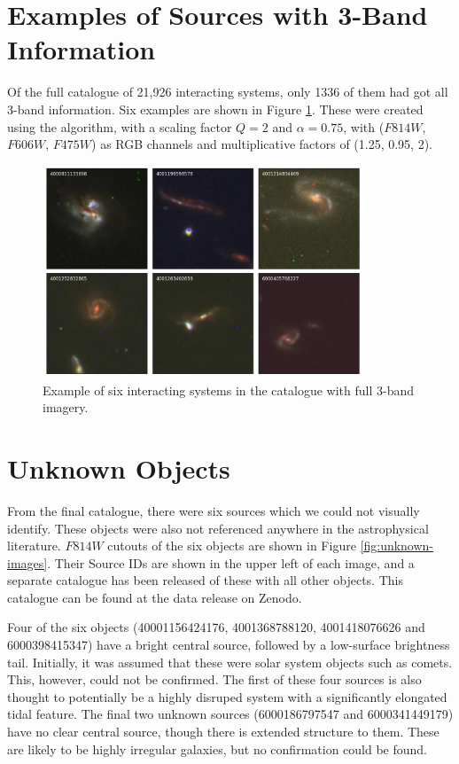 \section{Examples of Sources with 3-Band Information}\label{colour-images}
\noindent Of the full catalogue of 21,926 interacting systems, only 1336 of them had got all 3-band information. Six examples are shown in Figure \ref{fig:colour-images}. These were created using the \citet{lupton_04} algorithm, with a scaling factor $Q = 2$ and $\alpha = 0.75$, with ($F814W$, $F606W$, $F475W$) as RGB channels and multiplicative factors of (1.25, 0.95, 2).

\begin{figure}
  \centering
  \includegraphics[width = 0.85\textwidth]{Chapter2/figures/fig16.jpeg}
  \caption{Example of six interacting systems in the catalogue with full 3-band imagery.}
  \label{fig:colour-images}
\end{figure}

\section{Unknown Objects}\label{unknown-object}
\noindent From the final catalogue, there were six sources which we could not visually identify. These objects were also not referenced anywhere in the astrophysical literature. $F814W$ cutouts of the six objects are shown in Figure \ref{fig:unknown-images}. Their Source IDs are shown in the upper left of each image, and a separate catalogue has been released of these with all other objects. This catalogue can be found at the data release on Zenodo.

Four of the six objects (40001156424176, 4001368788120, 4001418076626 and 6000398415347) have a bright central source, followed by a low-surface brightness tail. Initially, it was assumed that these were solar system objects such as comets. This, however, could not be confirmed. The first of these four sources is also thought to potentially be a highly disruped system with a significantly elongated tidal feature. The final two unknown sources (6000186797547 and 6000341449179) have no clear central source, though there is extended structure to them. These are likely to be highly irregular galaxies, but no confirmation could be found.

